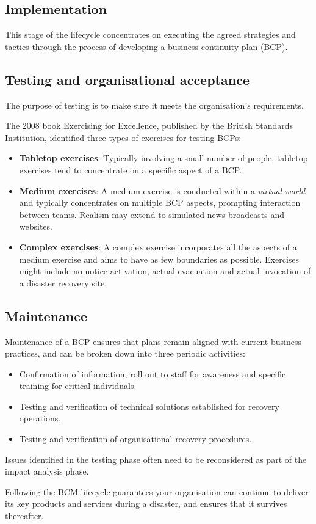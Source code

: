 \documentclass[a4paper,12pt]{article}
\begin{document}
\subsection{Implementation}
This stage of the lifecycle concentrates on executing the agreed strategies and tactics through the process of developing a business continuity plan (BCP).

\subsection{Testing and organisational acceptance}
The purpose of testing is to make sure it meets the organisation’s requirements.

The 2008 book Exercising for Excellence, published by the British Standards Institution, identified three types of exercises for testing BCPs:

\begin{itemize}
\item \textbf{Tabletop exercises}: Typically involving a small number of people, tabletop exercises tend to concentrate on a specific aspect of a BCP.
\item \textbf{Medium exercises}: A medium exercise is conducted within a \emph{virtual world} and typically concentrates on multiple BCP aspects, prompting interaction between teams. Realism may extend to simulated news broadcasts and websites.
\item \textbf{Complex exercises}: A complex exercise incorporates all the aspects of a medium exercise and aims to have as few boundaries as possible. Exercises might include no-notice activation, actual evacuation and actual invocation of a disaster recovery site.
\end{itemize}

\subsection{Maintenance}
Maintenance of a BCP ensures that plans remain aligned with current business practices, and can be broken down into three periodic activities:

\begin{itemize}
\item Confirmation of information, roll out to staff for awareness and specific training for critical individuals.
\item Testing and verification of technical solutions established for recovery operations.
\item Testing and verification of organisational recovery procedures.
\end{itemize}
Issues identified in the testing phase often need to be reconsidered as part of the impact analysis phase.

Following the BCM lifecycle guarantees your organisation can continue to deliver its key products and services during a disaster, and ensures that it survives thereafter.
\end{document}
